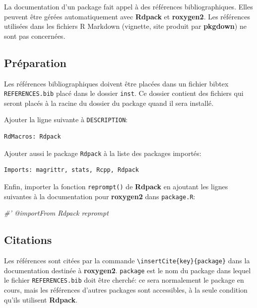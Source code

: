 \documentclass[
  12pt,
  french,
  a4paper,
  extrafontsizes,onecolumn,openright
  ]{memoir}
\newenvironment{Shaded}{\begin{snugshade}}{\end{snugshade}}
\newcommand{\CommentTok}[1]{\textcolor[rgb]{0.56,0.35,0.01}{\textit{#1}}}
\begin{document}
La documentation d'un package fait appel à des références bibliographiques.
Elles peuvent être gérées automatiquement avec \textbf{Rdpack} et \textbf{roxygen2}.
Les références utilisées dans les fichiers R Markdown (vignette, site produit par \textbf{pkgdown}) ne sont pas concernées.

\hypertarget{pruxe9paration}{%
\subsection{Préparation}\label{pruxe9paration}}

Les références bibliographiques doivent être placées dans un fichier bibtex \texttt{REFERENCES.bib} placé dans le dossier \texttt{inst}.
Ce dossier contient des fichiers qui seront placés à la racine du dossier du package quand il sera installé.

Ajouter la ligne suivante à \texttt{DESCRIPTION}:

\begin{verbatim}
RdMacros: Rdpack
\end{verbatim}

Ajouter aussi le package \texttt{Rdpack} à la liste des packages importés:

\begin{verbatim}
Imports: magrittr, stats, Rcpp, Rdpack
\end{verbatim}

Enfin, importer la fonction \texttt{reprompt()} de \textbf{Rdpack} en ajoutant les lignes suivantes à la documentation pour \textbf{roxygen2} dans \texttt{package.R}:

\scriptsize

\begin{Shaded}
\begin{Highlighting}[]
\CommentTok{#' @importFrom Rdpack reprompt}
\end{Highlighting}
\end{Shaded}

\normalsize

\hypertarget{citations}{%
\subsection{Citations}\label{citations}}

Les références sont citées par la commande \texttt{\textbackslash{}insertCite\{key\}\{package\}} dans la documentation destinée à \textbf{roxygen2}.
\texttt{package} est le nom du package dans lequel le fichier \texttt{REFERENCES.bib} doit être cherché: ce sera normalement le package en cours, mais les références d'autres packages sont accessibles, à la seule condition qu'ils utilisent \textbf{Rdpack}.
\end{document}
